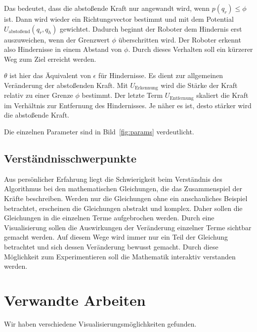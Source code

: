 Das bedeutet, dass die abstoßende Kraft nur angewandt wird, wenn $p(q_r) \leq \phi$ ist. 
Dann wird wieder ein Richtungsvector bestimmt und mit dem Potential $U_{\text{abstoßend}}(q_r, q_h)$ gewichtet.
Dadurch beginnt der Roboter dem Hindernis erst auszuweichen, wenn der Grenzwert $\phi$ überschritten wird.
Der Roboter erkennt also Hindernisse in einem Abstand von $\phi$.
Durch dieses Verhalten soll ein kürzerer Weg zum Ziel erreicht werden.

$\theta$ ist hier das Äquivalent von $\epsilon$ für Hindernisse. 
Es dient zur allgemeinen Veränderung der abstoßenden Kraft.
Mit $U_{\text{Erkennung}}$ wird die Stärke der Kraft relativ zu einer Grenze $\phi$ bestimmt.
Der letzte Term $U_{\text{Entfernung}}$ skaliert die Kraft im Verhältnis zur Entfernung des Hindernisses. Je näher es ist, desto stärker wird die abstoßende Kraft.

Die einzelnen Parameter sind in Bild~\vref{fig:params} verdeutlicht.


\subsection{Verständnisschwerpunkte}
Aus persönlicher Erfahrung liegt die Schwierigkeit beim Verständnis des Algorithmus bei den mathematischen Gleichungen, die das Zusammenspiel der Kräfte beschreiben.
Werden nur die Gleichungen ohne ein anschauliches Beispiel betrachtet, erscheinen die Gleichungen abstrakt und  komplex.
Daher sollen die Gleichungen in die einzelnen Terme aufgebrochen werden.
Durch eine Visualisierung sollen die Auswirkungen der Veränderung einzelner Terme sichtbar gemacht werden.
Auf diesem Wege wird immer nur ein Teil der Gleichung betrachtet und sich dessen Veränderung bewusst gemacht.
Durch diese Möglichkeit zum Experimentieren soll die Mathematik interaktiv verstanden werden. 

\section{Verwandte Arbeiten}

Wir haben verschiedene Visualisierungsmöglichkeiten gefunden.


